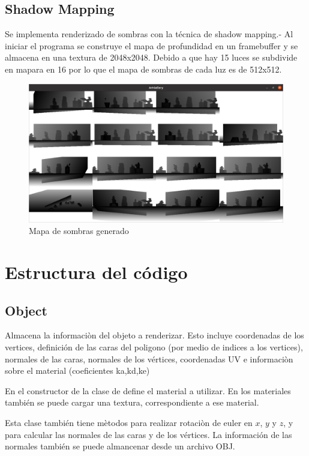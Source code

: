 \documentclass[12pt]{article}
\begin{document}
\subsection{Shadow Mapping}
Se implementa renderizado de sombras con la técnica de shadow mapping.- Al iniciar el programa se construye el mapa de profundidad en un framebuffer y se almacena en una textura de 2048x2048. Debido a que hay 15 luces se subdivide en mapara en 16 por lo que el mapa de sombras de cada luz es de 512x512.

\begin{figure}[H]
\centering
\includegraphics[scale=0.5]{images/mapasombra.png}
\caption{Mapa de sombras generado}
\end{figure}


\section{Estructura del código}


 \subsection{Object}
Almacena la informaciòn del objeto a renderizar. Esto incluye coordenadas de los vertices, definición de las caras del poligono (por medio de indices a los vertices), normales de las caras, normales de los vértices, coordenadas UV e informaciòn sobre el material (coeficientes ka,kd,ke)

En el constructor de la clase de define el material a utilizar. En los materiales también se puede cargar una textura, correspondiente a ese material.

Esta clase también tiene mètodos para realizar rotaciòn de euler en $x$, $y$ y $z$, y para calcular las normales de las caras y de los vértices. La información de las normales también se puede almancenar desde un archivo OBJ.
\end{document}
